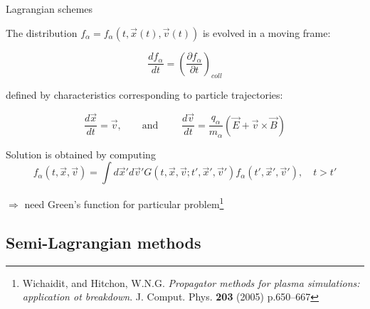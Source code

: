 \documentclass{beamer}
\begin{document}
\begin{frame}{Lagrangian schemes}

The distribution $f_{\alpha} = f_{\alpha}(t,\vec{x}(t),\vec{v}(t))$ is evolved in a moving frame:
 
$$\frac{df_{\alpha}}{dt} =  \left(\frac{\partial f_{\alpha}}{\partial t}\right)_{coll}$$

defined by characteristics corresponding to particle trajectories:

$$\frac{d\vec{x}}{dt} = \vec{v}, \qquad \text{and } \qquad \frac{d\vec{v}}{dt} =  \frac{q_{\alpha}}{m_{\alpha}}\left( \vec{E} + \vec{v} \times \vec{B}\right)$$

Solution is obtained by computing
$$f_{\alpha}(t,\vec{x},\vec{v}) = \int d\vec{x}' d\vec{v}' G(t,\vec{x},\vec{v}; t',\vec{x}',\vec{v}') f_{\alpha}(t',\vec{x}',\vec{v}'), \quad t > t'$$

$\Rightarrow$ need Green's function for particular problem\footnote{Wichaidit, and Hitchon, W.N.G. \emph{Propagator methods for plasma simulations: application ot breakdown}. J. Comput. Phys. \textbf{203} (2005) p.650--667}

\end{frame}
 


\subsection{Semi-Lagrangian methods}

\end{document}
